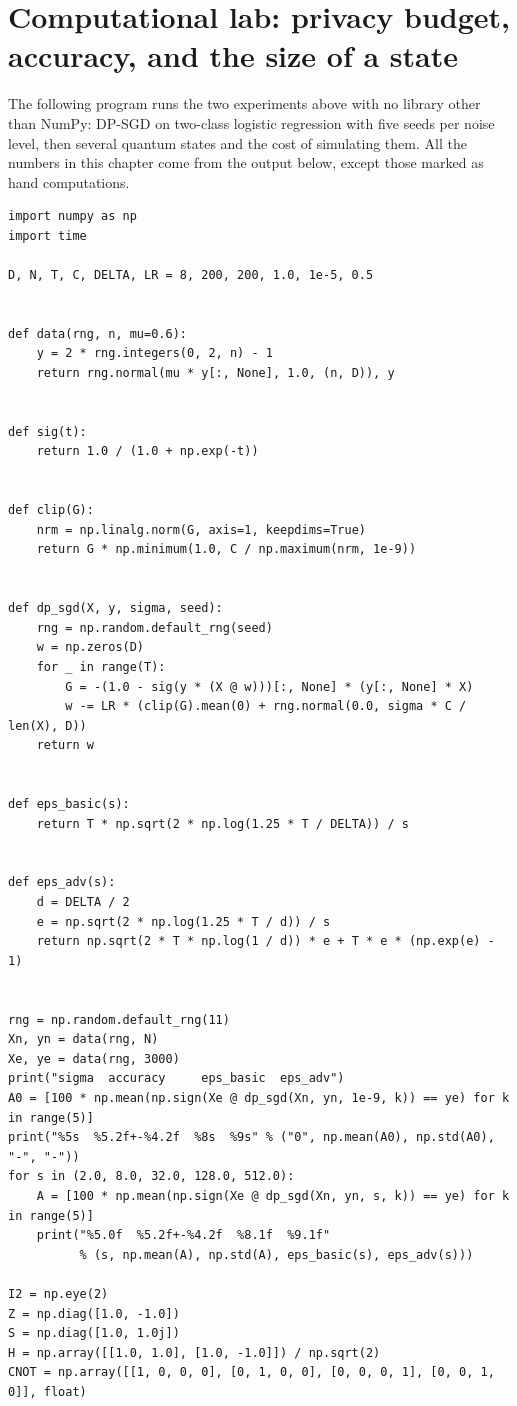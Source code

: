 \section{Computational lab: privacy budget, accuracy, and the size of a state}

The following program runs the two experiments above with no library other than NumPy:
DP-SGD on two-class logistic regression with five seeds per noise level, then several
quantum states and the cost of simulating them. All the numbers in this chapter come from
the output below, except those marked as hand computations.

\begin{lab}
\begin{verbatim}
import numpy as np
import time

D, N, T, C, DELTA, LR = 8, 200, 200, 1.0, 1e-5, 0.5


def data(rng, n, mu=0.6):
    y = 2 * rng.integers(0, 2, n) - 1
    return rng.normal(mu * y[:, None], 1.0, (n, D)), y


def sig(t):
    return 1.0 / (1.0 + np.exp(-t))


def clip(G):
    nrm = np.linalg.norm(G, axis=1, keepdims=True)
    return G * np.minimum(1.0, C / np.maximum(nrm, 1e-9))


def dp_sgd(X, y, sigma, seed):
    rng = np.random.default_rng(seed)
    w = np.zeros(D)
    for _ in range(T):
        G = -(1.0 - sig(y * (X @ w)))[:, None] * (y[:, None] * X)
        w -= LR * (clip(G).mean(0) + rng.normal(0.0, sigma * C / len(X), D))
    return w


def eps_basic(s):
    return T * np.sqrt(2 * np.log(1.25 * T / DELTA)) / s


def eps_adv(s):
    d = DELTA / 2
    e = np.sqrt(2 * np.log(1.25 * T / d)) / s
    return np.sqrt(2 * T * np.log(1 / d)) * e + T * e * (np.exp(e) - 1)


rng = np.random.default_rng(11)
Xn, yn = data(rng, N)
Xe, ye = data(rng, 3000)
print("sigma  accuracy     eps_basic  eps_adv")
A0 = [100 * np.mean(np.sign(Xe @ dp_sgd(Xn, yn, 1e-9, k)) == ye) for k in range(5)]
print("%5s  %5.2f+-%4.2f  %8s  %9s" % ("0", np.mean(A0), np.std(A0), "-", "-"))
for s in (2.0, 8.0, 32.0, 128.0, 512.0):
    A = [100 * np.mean(np.sign(Xe @ dp_sgd(Xn, yn, s, k)) == ye) for k in range(5)]
    print("%5.0f  %5.2f+-%4.2f  %8.1f  %9.1f"
          % (s, np.mean(A), np.std(A), eps_basic(s), eps_adv(s)))

I2 = np.eye(2)
Z = np.diag([1.0, -1.0])
S = np.diag([1.0, 1.0j])
H = np.array([[1.0, 1.0], [1.0, -1.0]]) / np.sqrt(2)
CNOT = np.array([[1, 0, 0, 0], [0, 1, 0, 0], [0, 0, 0, 1], [0, 0, 1, 0]], float)



\end{verbatim}
\end{lab}
